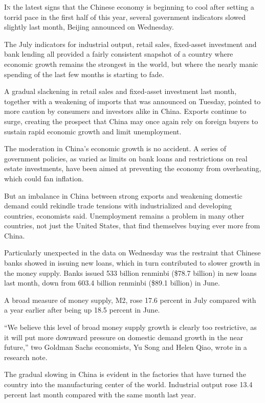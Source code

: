 ﻿\documentclass[12pt]{article}
\begin{document}
\lettrine{I}{n} the latest signs that the Chinese economy is beginning to
cool after setting a torrid pace in the first half of this year, several government indicators
slowed slightly last month, Beijing announced on Wednesday.

The July indicators for industrial output, retail sales, fixed-asset investment and bank lending all
provided a fairly consistent snapshot of a country where economic growth remains the strongest in
the world, but where the nearly manic spending of the last few months is starting to fade.

A gradual slackening in retail sales and fixed-asset investment last month, together with a
weakening of imports that was announced on Tuesday, pointed to more caution by consumers and
investors alike in China. Exports continue to surge, creating the prospect that China may once again
rely on foreign buyers to sustain rapid economic growth and limit unemployment.

The moderation in China's economic growth is no accident. A series of government policies, as varied
as limits on bank loans and restrictions on real estate investments, have been aimed at preventing
the economy from overheating, which could fan inflation.

But an imbalance in China between strong exports and weakening domestic demand could rekindle trade
tensions with industrialized and developing countries, economists said. Unemployment remains a
problem in many other countries, not just the United States, that find themselves buying ever more
from China.

Particularly unexpected in the data on Wednesday was the restraint that Chinese banks showed in
issuing new loans, which in turn contributed to slower growth in the money supply. Banks issued 533
billion renminbi (\$78.7 billion) in new loans last month, down from 603.4 billion renminbi (\$89.1
billion) in June.

A broad measure of money supply, M2, rose 17.6 percent in July compared with a year earlier after
being up 18.5 percent in June.

``We believe this level of broad money supply growth is clearly too restrictive, as it will put more
downward pressure on domestic demand growth in the near future,'' two Goldman Sachs economists, Yu
Song and Helen Qiao, wrote in a research note.

The gradual slowing in China is evident in the factories that have turned the country into the
manufacturing center of the world. Industrial output rose 13.4 percent last month compared with the
same month last year.
\end{document}
